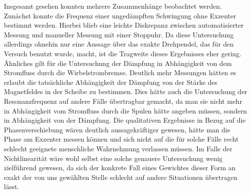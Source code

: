 \documentclass[
	a4paper,
	12pt,
	pagesize,
	ngerman
]{scrartcl}
\begin{document}
	Insgesamt gesehen konnten mehrere Zusammenhänge beobachtet werden. Zunächst konnte die Frequenz einer ungedämpften Schwingung ohne Exzenter bestimmt werden. Hierbei blieb eine leichte Diskrepanz zwischen automatisierter Messung und manueller Messung mit einer Stoppuhr. Da diese Untersuchung allerdings ohnehin nur eine Aussage über das exakte Drehpendel, das für den Versuch benutzt wurde, macht, ist die Tragweite dieses Ergebnisses eher gering. Ähnliches gilt für die Untersuchung der Dämpfung in Abhängigkeit von dem Stromfluss durch die Wirbelstrombremse. Deutlich mehr Messungen hätten es erlaubt die tatsächliche Abhängigkeit der Dämpfung von der Stärke des Magnetfeldes in der Scheibe zu bestimmen. Dies hätte auch die Untersuchung der Resonanzfrequenz auf andere Fälle übertragbar gemacht, da man sie nicht mehr in Abhängigkeit vom Stromfluss durch die Spulen hätte angeben müssen, sondern in Abhängigkeit von der Dämpfung.
	Die qualitativen Ergebnisse in Bezug auf die Phasenverschiebung wären deutlich aussagekräftiger gewesen, hätte man die Phase am Exzenter messen können und sich nicht auf die für solche Fälle recht schlecht geeignete menschliche Wahrnehmung verlassen müssen. Im Falle der Nichtlinearität wäre wohl selbst eine solche genauere Untersuchung wenig zielführend gewesen, da sich der konkrete Fall eines Gewichtes dieser Form an exakt der von uns gewählten Stelle schlecht auf andere Situationen übertragen lässt.
\end{document}
